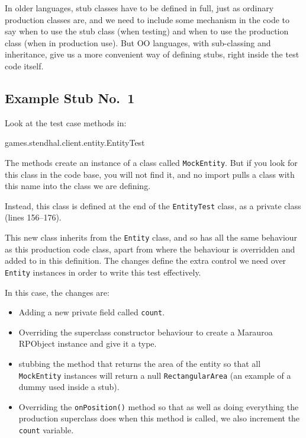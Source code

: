 \documentclass[
]{book}
\newenvironment{Shaded}{\begin{snugshade}}{\end{snugshade}}
\newcommand{\FunctionTok}[1]{\textcolor[rgb]{0.00,0.00,0.00}{#1}}
\newcommand{\NormalTok}[1]{#1}
\providecommand{\tightlist}{%
  \setlength{\itemsep}{0pt}\setlength{\parskip}{0pt}}
\begin{document}
In older languages, stub classes have to be defined in full, just as ordinary production classes are, and we need to include some mechanism in the code to say when to use the stub class (when testing) and when to use the production class (when in production use). But OO languages, with sub-classing and inheritance, give us a more convenient way of defining stubs, right inside the test code itself.

\hypertarget{stubby1}{%
\subsection{Example Stub No.~1}\label{stubby1}}

Look at the test case methods in:

\begin{Shaded}
\begin{Highlighting}[]
\NormalTok{games.}\FunctionTok{stendhal}\NormalTok{.}\FunctionTok{client}\NormalTok{.}\FunctionTok{entity}\NormalTok{.}\FunctionTok{EntityTest}
\end{Highlighting}
\end{Shaded}

The methods create an instance of a class called \texttt{MockEntity}. But if you look for this class in the code base, you will not find it, and no import pulls a class with this name into the class we are defining.

Instead, this class is defined at the end of the \texttt{EntityTest} class, as a private class (lines 156--176).

This new class inherits from the \texttt{Entity} class, and so has all the same behaviour as this production code class, apart from where the behaviour is overridden and added to in this definition. The changes define the extra control we need over \texttt{Entity} instances in order to write this test effectively.

In this case, the changes are:

\begin{itemize}
\tightlist
\item
  Adding a new private field called \texttt{count}.
\item
  Overriding the superclass constructor behaviour to create a Marauroa RPObject instance and give it a type.
\item
  stubbing the method that returns the area of the entity so that all \texttt{MockEntity} instances will return a null \texttt{RectangularArea} (an example of a dummy used inside a stub).
\item
  Overriding the \texttt{onPosition()} method so that as well as doing everything the production superclass does when this method is called, we also increment the \texttt{count} variable.
\end{itemize}
\end{document}
